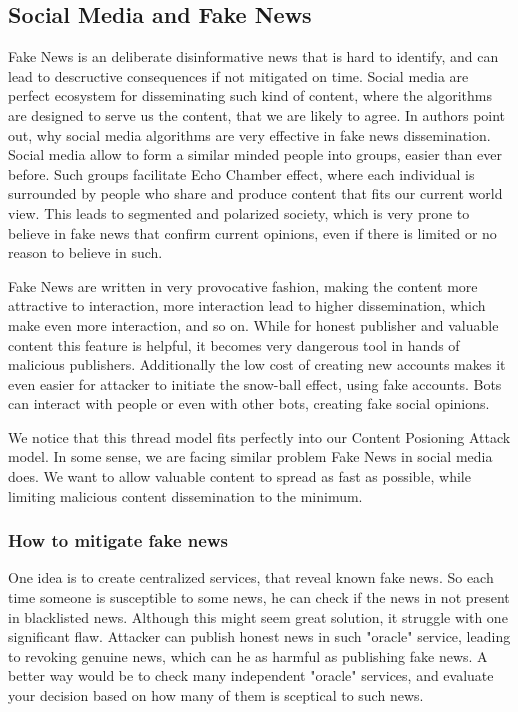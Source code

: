 \documentclass[nostrict]{szablonPG}
\begin{document}
\subsection{Social Media and Fake News}
Fake News is an deliberate disinformative news that is hard to identify, and can lead to descructive consequences if not mitigated on time. Social media are perfect ecosystem for disseminating such kind of content, where the algorithms are designed to serve us the content, that we are likely to agree. In \cite{zhou2018fake} authors point out, why social media algorithms are very effective in fake news dissemination. Social media allow to form a similar minded people into groups, easier than ever before. Such groups facilitate Echo Chamber effect, where each individual is surrounded by people who share and produce content that fits our current world view. This leads to segmented and polarized society, which is very prone to believe in fake news that confirm current opinions, even if there is limited or no reason to believe in such. 

Fake News are written in very provocative fashion, making the content more attractive to interaction, more interaction lead to higher dissemination, which make even more interaction, and so on. While for honest publisher and valuable content this feature is helpful, it becomes very dangerous tool in hands of malicious publishers. Additionally the low cost of creating new accounts makes it even easier for attacker to initiate the snow-ball effect, using fake accounts. Bots can interact with people or even with other bots, creating fake social opinions.  

We notice that this thread model fits perfectly into our Content Posioning Attack model. In some sense, we are facing similar problem Fake News in social media does. We want to allow valuable content to spread as fast as possible, while limiting malicious content dissemination to the minimum.


\subsubsection{How to mitigate fake news}
One idea is to create centralized services, that reveal known fake news. So each time someone is susceptible to some news, he can check if the news in not present in blacklisted news. Although this might seem great solution, it struggle with one significant flaw. Attacker can publish honest news in such "oracle" service, leading to revoking genuine news, which can he as harmful as publishing fake news. A better way would be to check many independent "oracle" services, and evaluate your decision based on how many of them is sceptical to such news.
\end{document}
